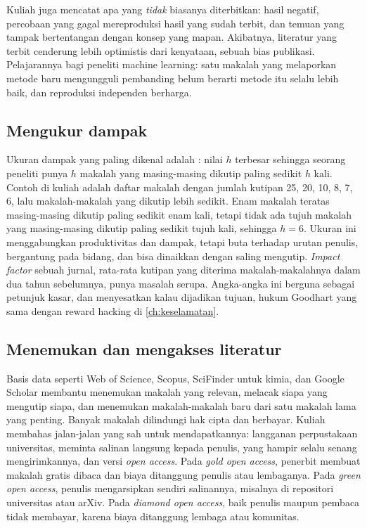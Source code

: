 Kuliah juga mencatat apa yang \emph{tidak} biasanya diterbitkan: hasil negatif, percobaan yang gagal mereproduksi hasil yang sudah
terbit, dan temuan yang tampak bertentangan dengan konsep yang mapan. Akibatnya, literatur yang terbit cenderung lebih optimistis
dari kenyataan, sebuah bias publikasi. Pelajarannya bagi peneliti machine learning: satu makalah yang melaporkan metode baru
mengungguli pembanding belum berarti metode itu selalu lebih baik, dan reproduksi independen berharga.

\subsection{Mengukur dampak}

Ukuran dampak yang paling dikenal adalah : nilai $h$ terbesar sehingga seorang peneliti punya $h$ makalah yang
masing-masing dikutip paling sedikit $h$ kali. Contoh di kuliah adalah daftar makalah dengan jumlah kutipan 25, 20, 10, 8, 7, 6, lalu
makalah-makalah yang dikutip lebih sedikit. Enam makalah teratas masing-masing dikutip paling sedikit enam kali, tetapi tidak ada
tujuh makalah yang masing-masing dikutip paling sedikit tujuh kali, sehingga $h=6$. Ukuran ini menggabungkan produktivitas dan dampak,
tetapi buta terhadap urutan penulis, bergantung pada bidang, dan bisa dinaikkan dengan saling mengutip. \emph{Impact factor}
sebuah jurnal, rata-rata kutipan yang diterima makalah-makalahnya dalam dua tahun sebelumnya, punya masalah serupa. Angka-angka ini
berguna sebagai petunjuk kasar, dan menyesatkan kalau dijadikan tujuan, hukum Goodhart yang sama dengan reward hacking di
\cref{ch:keselamatan}.

\subsection{Menemukan dan mengakses literatur}

Basis data seperti Web of Science, Scopus, SciFinder untuk kimia, dan Google Scholar membantu menemukan makalah yang relevan, melacak
siapa yang mengutip siapa, dan menemukan makalah-makalah baru dari satu makalah lama yang penting. Banyak makalah dilindungi hak cipta
dan berbayar. Kuliah membahas jalan-jalan yang sah untuk mendapatkannya: langganan perpustakaan universitas, meminta salinan langsung
kepada penulis, yang hampir selalu senang mengirimkannya, dan versi \emph{open access}. Pada \emph{gold open access}, penerbit membuat
makalah gratis dibaca dan biaya ditanggung penulis atau lembaganya. Pada \emph{green open access}, penulis mengarsipkan sendiri
salinannya, misalnya di repositori universitas atau arXiv. Pada \emph{diamond open access}, baik penulis maupun pembaca tidak membayar,
karena biaya ditanggung lembaga atau komunitas.

